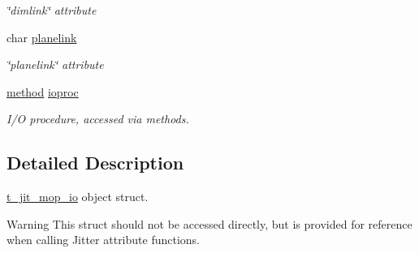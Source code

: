 \begin{DoxyCompactItemize}
\begin{DoxyCompactList}\small\item\em \char`\"{}dimlink\char`\"{} attribute \item\end{DoxyCompactList}\item 
\hypertarget{structt__jit__mop__io_a1b3d5c35fb8f6daa1ba6f124f8422fa7}{
char \hyperlink{structt__jit__mop__io_a1b3d5c35fb8f6daa1ba6f124f8422fa7}{planelink}}
\label{structt__jit__mop__io_a1b3d5c35fb8f6daa1ba6f124f8422fa7}

\begin{DoxyCompactList}\small\item\em \char`\"{}planelink\char`\"{} attribute \item\end{DoxyCompactList}\item 
\hypertarget{structt__jit__mop__io_a74bdd47ffda0859584fbb6f98cd0927b}{
\hyperlink{group__datatypes_gac26ba0a173b50597f5738132e059b42d}{method} \hyperlink{structt__jit__mop__io_a74bdd47ffda0859584fbb6f98cd0927b}{ioproc}}
\label{structt__jit__mop__io_a74bdd47ffda0859584fbb6f98cd0927b}

\begin{DoxyCompactList}\small\item\em I/O procedure, accessed via methods. \item\end{DoxyCompactList}\end{DoxyCompactItemize}


\subsection{Detailed Description}
\hyperlink{structt__jit__mop__io}{t\_\-jit\_\-mop\_\-io} object struct. \begin{DoxyWarning}{Warning}
This struct should not be accessed directly, but is provided for reference when calling Jitter attribute functions. 
\end{DoxyWarning}
